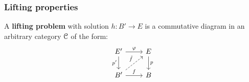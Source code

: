         \subsubsection{Lifting properties}
            \begin{definition} \label{def: lifting_problems}
                A \textbf{lifting problem} with solution $h: B' \to E$ is a commutative diagram in an arbitrary category $\mathcal{C}$ of the form:
                    $$
                        \begin{tikzcd}
                        	{E'} & E \\
                        	{B'} & B
                        	\arrow["{p'}"', from=1-1, to=2-1]
                        	\arrow["f", from=2-1, to=2-2]
                        	\arrow["p", from=1-2, to=2-2]
                        	\arrow["\varphi", from=1-1, to=1-2]
                        	\arrow["{\tilde{f}}", dashed, from=2-1, to=1-2]
                        \end{tikzcd}
                    $$
            \end{definition}
